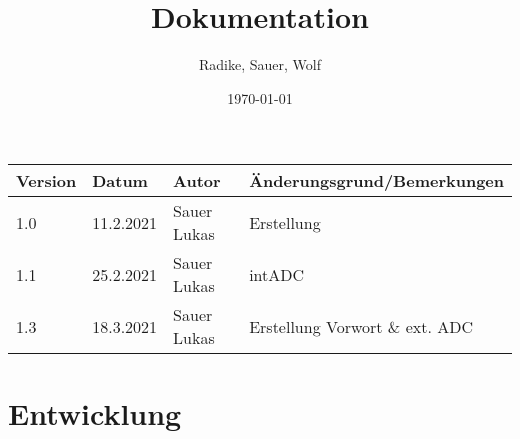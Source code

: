 \documentclass[a4paper,12pt]{article}
\begin{document}
\title{Dokumentation}
\author{Radike, Sauer, Wolf}
\date{\today}
\maketitle

\begin{tabular}[h]{l|l|l|l} %
	Version & Datum & Autor & Änderungsgrund/Bemerkungen\\
	\hline
	1.0 & 11.2.2021 & Sauer Lukas & Erstellung\\
	\hline
	1.1 & 25.2.2021 & Sauer Lukas & intADC\\
	\hline
	1.3 & 18.3.2021 & Sauer Lukas & Erstellung Vorwort \& ext. ADC\\
\end{tabular}
\newpage
\tableofcontents
\newpage


\section{Entwicklung}


\end{document}
